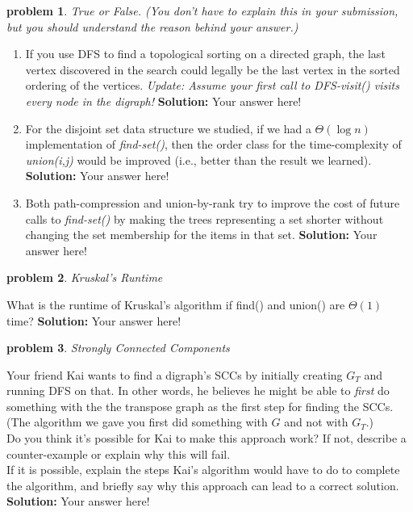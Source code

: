 \documentclass[10pt]{article}
\newcommand{\solution}[1]{\color{blue}\hfill\break\noindent\textbf{Solution:} #1\color{black}}
\newtheorem{problem}{\sc\color{cit}problem}
\begin{document}
\begin{problem} True or False. (You don't have to explain this in your submission, but you should understand the reason behind your answer.)  \end{problem}

\begin{enumerate}
\renewcommand{\theenumi}{\Alph{enumi}}

    \item  If you use DFS to find a topological sorting on a directed graph, the last vertex discovered in the search could legally be the last vertex in the sorted ordering of the vertices. {\em Update: Assume your first call to DFS-visit() visits every node in the digraph!}
    \solution{
    Your answer here!
    }
    
    \item For the disjoint set data structure we studied, if we had a $\Theta(\log n)$ implementation of \emph{find-set()}, then the order class for the time-complexity of \emph{union(i,j)} would be improved (i.e., better than the result we learned).
    \solution{
    Your answer here!
    }
    
    \item Both path-compression and union-by-rank try to improve the cost of future calls to \emph{find-set()} by making the trees representing a set shorter without changing the set membership for the items in that set.
    \solution{
    Your answer here!
    }
    
\end{enumerate}

\begin{problem} Kruskal's Runtime \end{problem}
What is the runtime of Kruskal’s algorithm if find() and union() are $\Theta(1)$ time?
\solution{
    Your answer here!
}

\begin{problem} Strongly Connected Components \end{problem}

Your friend Kai wants to find a digraph's SCCs by initially creating $G_T$ and running DFS on that. In other words, he believes he might be able to \textit{first} do something with the the transpose graph as the first step for finding the SCCs. (The algorithm we gave you first did something with $G$ and not with $G_T$.) \\
Do you think it's possible for Kai to make this approach work? If not, describe a counter-example or explain why this will fail. \\
If it is possible, explain the steps Kai's algorithm would have to do to complete the algorithm, and briefly say why this approach can lead to a correct solution.
\solution{
    Your answer here!
}
\end{document}
